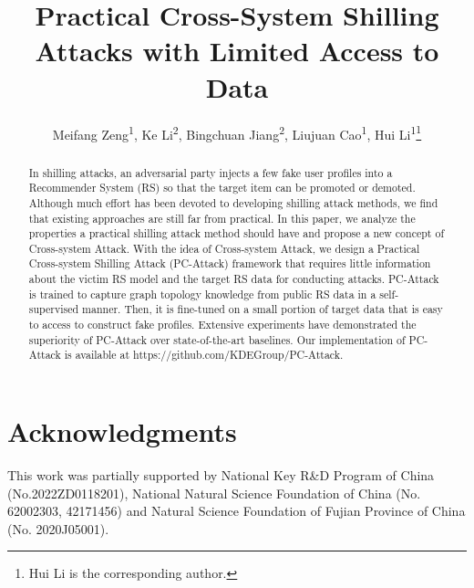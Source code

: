 \documentclass[letterpaper]{article} %
\title{Practical Cross-System Shilling Attacks with Limited Access to Data}
\author {
    Meifang Zeng\textsuperscript{\rm 1},
    Ke Li\textsuperscript{\rm 2},
    Bingchuan Jiang\textsuperscript{\rm 2},
    Liujuan Cao\textsuperscript{\rm 1},
    Hui Li\textsuperscript{\rm 1}\thanks{Hui Li is the corresponding author.}\\
}
\begin{document}
\maketitle

\begin{abstract}
In shilling attacks, an adversarial party injects a few fake user profiles into a Recommender System (RS) so that the target item can be promoted or demoted. Although much effort has been devoted to developing shilling attack methods, we find that existing approaches are still far from practical. In this paper, we analyze the properties a practical shilling attack method should have and propose a new concept of Cross-system Attack. With the idea of Cross-system Attack, we design a Practical Cross-system Shilling Attack (PC-Attack) framework that requires little information about the victim RS model and the target RS data for conducting attacks. PC-Attack is trained to capture graph topology knowledge from public RS data in a self-supervised manner. Then, it is fine-tuned on a small portion of target data that is easy to access to construct fake profiles. Extensive experiments have demonstrated the superiority of PC-Attack over state-of-the-art baselines. Our implementation of PC-Attack is available at https://github.com/KDEGroup/PC-Attack.
\end{abstract}








\section*{Acknowledgments}
This work was partially supported by National Key R\&D Program of China (No.2022ZD0118201), National Natural Science Foundation of China (No. 62002303, 42171456) and  Natural Science Foundation of Fujian Province of China (No. 2020J05001).
\end{document}
